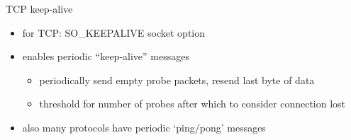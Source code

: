 

\begin{frame}{TCP keep-alive}
    \begin{itemize}
    \item for TCP: SO\_KEEPALIVE socket option
    \item enables periodic ``keep-alive'' messages
        \begin{itemize}
        \item periodically send empty probe packets, resend last byte of data
        \item threshold for number of probes after which to consider connection lost
        \end{itemize}
    \vspace{.5cm}
    \item also many protocols have periodic `ping/pong' messages
    \end{itemize}
\end{frame}
